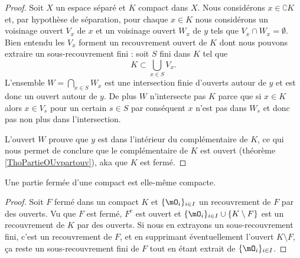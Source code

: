 \begin{proof}
    Soit \( X\) un espace séparé et \( K\) compact dans \( X\). Nous considérons \( x\in\complement K\) et, par hypothèse de séparation, pour chaque \( x\in K\) nous considérons un voisinage ouvert \( V_x\) de \( x\) et un voisinage ouvert \( W_x\) de \( y\) tels que \( V_x\cap W_x=\emptyset\). Bien entendu les \( V_x\) forment un recouvrement ouvert de \( K\) dont nous pouvons extraire un sous-recouvrement fini : soit \( S\) fini dans \( K\) tel que
    \begin{equation}
        K\subset\bigcup_{x\in S}V_x.
    \end{equation}
    L'ensemble \( W=\bigcap_{x\in S}W_x\) est une intersection finie d'ouverts autour de \( y\) et est donc un ouvert autour de \( y\). De plus \( W\) n'intersecte pas \( K\) parce que si \( x\in K\) alors \( x\in V_s\) pour un certain \( s\in S\) par conséquent \( x\) n'est pas dans \( W_s\) et donc pas non plus dans l'intersection.

    L'ouvert \( W\) prouve que \( y\) est dans l'intérieur du complémentaire de \( K\), ce qui nous permet de conclure que le complémentaire de \( K\) est ouvert (théorème \ref{ThoPartieOUvpartouv}), aka que \( K\) est fermé.
\end{proof}

\begin{lemma}   \label{LemnAeACf}
    Une partie fermée d'une compact est elle-même compacte.
\end{lemma}

\begin{proof}
 
    Soit \( F\) fermé dans un compact \( K\) et \( \{ \mO_i \}_{i\in I}\) un recouvrement de \( F\) par des ouverts. Vu que \( F\) est fermé, \( F^c\) est ouvert et \( \{ \mO_i \}_{i\in I}\cup\{ K\setminus F \}\) est un recouvrement de \( K\) par des ouverts. Si nous en extrayons un sous-recouvrement fini, c'est un recouvrement de \( F\), et en supprimant éventuellement l'ouvert \( K\setminus F\), ça reste un sous-recouvrement fini de \( F\) tout en étant extrait de \( \{ \mO_i \}_{i\in I}\).
\end{proof}

